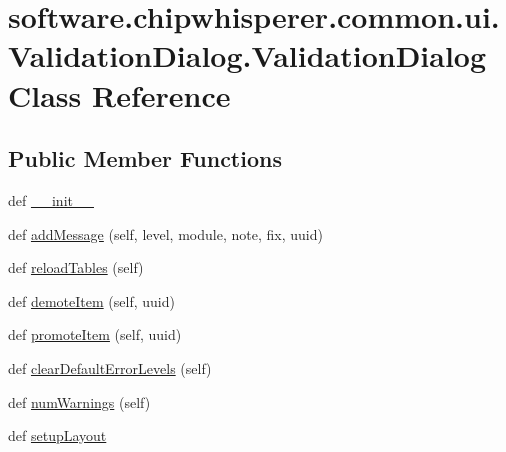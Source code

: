 \hypertarget{classsoftware_1_1chipwhisperer_1_1common_1_1ui_1_1ValidationDialog_1_1ValidationDialog}{}\section{software.\+chipwhisperer.\+common.\+ui.\+Validation\+Dialog.\+Validation\+Dialog Class Reference}
\label{classsoftware_1_1chipwhisperer_1_1common_1_1ui_1_1ValidationDialog_1_1ValidationDialog}
\subsection*{Public Member Functions}
\begin{DoxyCompactItemize}
\item 
def \hyperlink{classsoftware_1_1chipwhisperer_1_1common_1_1ui_1_1ValidationDialog_1_1ValidationDialog_adb939f1fb599f514a4079dc88a19c69b}{\+\_\+\+\_\+init\+\_\+\+\_\+}
\item 
def \hyperlink{classsoftware_1_1chipwhisperer_1_1common_1_1ui_1_1ValidationDialog_1_1ValidationDialog_ac4bfba49dea168da2a716b55d073113d}{add\+Message} (self, level, module, note, fix, uuid)
\item 
def \hyperlink{classsoftware_1_1chipwhisperer_1_1common_1_1ui_1_1ValidationDialog_1_1ValidationDialog_a89b14f66316c73c11680bc5d0f64c779}{reload\+Tables} (self)
\item 
def \hyperlink{classsoftware_1_1chipwhisperer_1_1common_1_1ui_1_1ValidationDialog_1_1ValidationDialog_a6baa9e8db5ca01815cd05c7519e4fd64}{demote\+Item} (self, uuid)
\item 
def \hyperlink{classsoftware_1_1chipwhisperer_1_1common_1_1ui_1_1ValidationDialog_1_1ValidationDialog_ad13d9c7d781a5ed3394e786a1b8c0825}{promote\+Item} (self, uuid)
\item 
def \hyperlink{classsoftware_1_1chipwhisperer_1_1common_1_1ui_1_1ValidationDialog_1_1ValidationDialog_ad39cfafe223df36fd7c88611ec681330}{clear\+Default\+Error\+Levels} (self)
\item 
def \hyperlink{classsoftware_1_1chipwhisperer_1_1common_1_1ui_1_1ValidationDialog_1_1ValidationDialog_abfcc769f3b197e8e23c0f4950fe91fbb}{num\+Warnings} (self)
\item 
def \hyperlink{classsoftware_1_1chipwhisperer_1_1common_1_1ui_1_1ValidationDialog_1_1ValidationDialog_a6c01e4980506a33e3e870324d948ae40}{setup\+Layout}
\end{DoxyCompactItemize}
